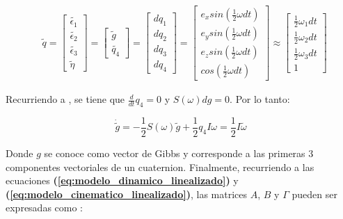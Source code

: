 \begin{equation}
	\begin{aligned}		
		& \tilde{q} = \left[\begin{array}{c}				
				\tilde{\epsilon_1}\\
				\tilde{\epsilon_2}\\
				\tilde{\epsilon_3} \\
				\tilde{\eta}
			\end{array}\right] =
			\left[\begin{array}{c}
				\tilde{g}\\				
				\tilde{q_4}
			\end{array}\right] =
				\left[\begin{array}{c}
				dq_1\\				
				dq_2\\
				dq_3\\
				dq_4
			\end{array}\right] =
				\left[\begin{array}{c}
					e_x sin\left(\frac{1}{2}\omega dt\right)\\
					e_y sin\left(\frac{1}{2}\omega dt\right)\\
					e_z sin\left(\frac{1}{2}\omega dt\right)\\
					cos\left(\frac{1}{2}\omega dt\right)
				\end{array}\right]\approx
				\left[\begin{array}{c}
					\frac{1}{2}\omega_1 dt\\				
					\frac{1}{2}\omega_2 dt\\
					\frac{1}{2}\omega_3 dt\\
					1
				\end{array}\right]						
	\end{aligned}	
\end{equation}

\noindent Recurriendo a \cite{Blanke2010}, se tiene que $\frac{d}{dt}q_4 = 0$ y $S(\omega)dg =0$. Por lo tanto:

\begin{equation}\label{eq:modelo_cinematico_linealizado}
	\dot{\tilde{g}} = -\frac{1}{2}S(\omega)\tilde{g}+\frac{1}{2}q_4I\omega = \frac{1}{2}I\tilde{\omega}
\end{equation}

Donde $g$ se conoce como vector de Gibbs y corresponde a las primeras 3 componentes vectoriales de un cuaternion. Finalmente, recurriendo a las ecuaciones \textbf{(\ref{eq:modelo_dinamico_linealizado})} y \textbf{(\ref{eq:modelo_cinematico_linealizado})}, las matrices $A$, $B$ y $\Gamma$ pueden ser expresadas como :

